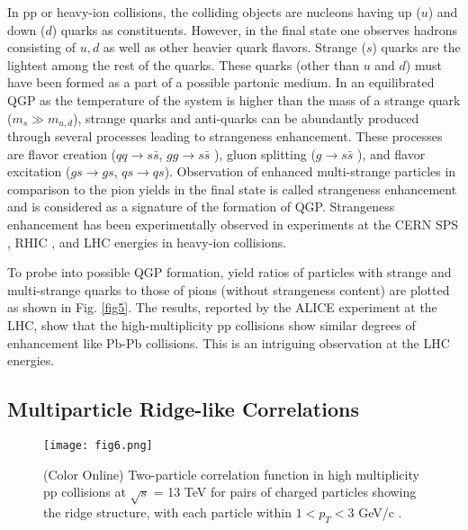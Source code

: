 \documentclass[showpacs,showkeys,aps,twocolumn]{revtex4}
\newcommand\+{\dagger}
\begin{document}
In pp or heavy-ion collisions, the colliding objects are nucleons having up ($u$) and down ($d$) quarks as constituents. However, in the final state one observes hadrons consisting of $u, d$ as well as other heavier quark flavors. Strange ($s$) quarks are the lightest among the rest of the quarks. These quarks (other than $u$ and $d$) must have been formed as a part of a possible partonic medium. In an equilibrated QGP as the temperature of the system is higher than the mass of a strange quark ($m_s \gg m_{u,d}$), strange quarks and anti-quarks can be abundantly produced through several processes leading to strangeness enhancement. These processes are flavor creation ($qq \rightarrow s\bar{s}$,  $gg \rightarrow s\bar{s}$ ), gluon splitting ($g \rightarrow s\bar{s}$ ), and flavor excitation ($gs \rightarrow gs$, $qs \rightarrow qs$). Observation of enhanced multi-strange particles in comparison to the pion yields in the final state is called strangeness enhancement and is considered as a signature of the formation of QGP. Strangeness enhancement has been experimentally observed in experiments at the CERN SPS \cite{Ref18}, RHIC \cite{Ref19}, and LHC \cite{Ref20} energies in heavy-ion collisions.

To probe into possible QGP formation, yield ratios of particles with strange and multi-strange quarks to those of pions (without strangeness content) are plotted as shown in Fig. \ref{fig5}. The results, reported by the ALICE experiment at the LHC, show that  the high-multiplicity pp collisions show similar degrees of enhancement like Pb-Pb collisions. This is an intriguing observation at the LHC energies.

\subsection{Multiparticle Ridge-like Correlations}
\begin{figure}[ht]
\texttt{[image: fig6.png]}
\caption[]{(Color Online) Two-particle correlation function in high multiplicity pp collisions at $\sqrt{s}$ = 13 TeV for pairs of charged particles showing the ridge structure, with each particle within $ 1 < p_T < 3 $ GeV/c \cite{Ref24}.}
\label{fig6}
\end{figure}
\end{document}
